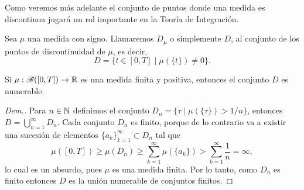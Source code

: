 {\color{green}
Como veremos más adelante el conjunto de puntos donde una medida es discontinua jugará un rol importante en la Teoría de Integración.
}

\begin{defi}\label{def:pto_cont}
	Sea $\mu$ una medida con signo.  Llamaremos $D_{\mu}$ o simplemente $D$, al conjunto de los puntos de discontinuidad  de $\mu$, es decir, 
	$$D=\{t \in [0,T]  \mid  \mu(\{t\})\neq 0\}.$$
\end{defi}


\begin{lem}\label{D numerable}
	Si $\mu:\mathscr{B}([0,T])\to \mathbb{R}$ es una medida finita y positiva, entonces el conjunto $D$ es numerable.
\end{lem}
\begin{proof}[Dem.]
	Para $n\in\mathbb{N}$ definimos el conjunto $D_n=\{\tau\mid\mu(\{\tau\})>1/n\}$, entonces $D=\bigcup_{n=1}^\infty D_n$. Cada conjunto $D_n$ es finito, porque de lo contrario va a existir una sucesión de elementos $\{a_k\}_{k=1}^\infty\subset D_n$ tal que 
	\begin{equation*}
		\mu([0,T])\geq\mu(D_n)\geq\sum_{k=1}^{\infty}\mu(\{a_k\})>\sum_{k=1}^{\infty}\dfrac{1}{n}=\infty,
	\end{equation*}
	lo cual es un absurdo, pues $\mu$ es una medida finita. Por lo tanto, como $D_n$ es finito entonces $D$ es la unión numerable de conjuntos finitos. 
\end{proof}
